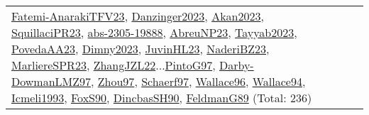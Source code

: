 {\begin{longtable}{p{3cm}r>{\raggedright\arraybackslash}p{6cm}>{\raggedright\arraybackslash}p{6cm}>{\raggedright\arraybackslash}p{8cm}}
\hyperref[detail:Fatemi-AnarakiTFV23]{Fatemi-AnarakiTFV23}, \hyperref[detail:Danzinger2023]{Danzinger2023}, \hyperref[detail:Akan2023]{Akan2023}, \hyperref[detail:SquillaciPR23]{SquillaciPR23}, \hyperref[detail:abs-2305-19888]{abs-2305-19888}, \hyperref[detail:AbreuNP23]{AbreuNP23}, \hyperref[detail:Tayyab2023]{Tayyab2023}, \hyperref[detail:PovedaAA23]{PovedaAA23}, \hyperref[detail:Dimny2023]{Dimny2023}, \hyperref[detail:JuvinHL23]{JuvinHL23}, \hyperref[detail:NaderiBZ23]{NaderiBZ23}, \hyperref[detail:MarliereSPR23]{MarliereSPR23}, \hyperref[detail:ZhangJZL22]{ZhangJZL22}...\hyperref[detail:PintoG97]{PintoG97}, \hyperref[detail:Darby-DowmanLMZ97]{Darby-DowmanLMZ97}, \hyperref[detail:Zhou97]{Zhou97}, \hyperref[detail:Schaerf97]{Schaerf97}, \hyperref[detail:Wallace96]{Wallace96}, \hyperref[detail:Wallace94]{Wallace94}, \hyperref[detail:Icmeli1993]{Icmeli1993}, \hyperref[detail:FoxS90]{FoxS90}, \hyperref[detail:DincbasSH90]{DincbasSH90}, \hyperref[detail:FeldmanG89]{FeldmanG89} (Total: 236)\\

\end{longtable}}
